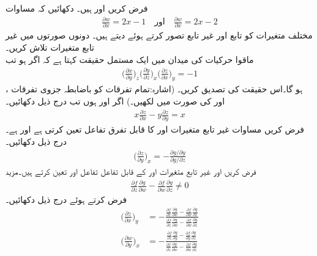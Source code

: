 فرض کریں  اور  ہیں۔ دکھائیں کہ مساوات
\begin{align*}
\tfrac{\partial w}{\partial x}=2x-1\quad \text{اور}\quad \tfrac{\partial w}{\partial x}=2x-2
\end{align*}
مختلف متغیرات کو تابع اور غیر تابع تصور کرتے ہوئے    دیتے ہیں۔ دونوں صورتوں  میں غیر تابع متغیرات تلاش کریں۔
\\
ماقوا حرکیات  کی میدان میں  ایک  مستمل حقیقت کہتا ہے کہ اگر  ہو تب
\begin{align*}
\big(\frac{\partial x}{\partial y}\big)_z \big(\frac{\partial y}{\partial z}\big)_x  \big(\frac{\partial z}{\partial x}\big)_y=-1
\end{align*}
ہو گا۔اس حقیقت  کی تصدیق کریں۔ (اشارہ:تمام تفرقات کو باضابطہ جزوی تفرقات ،   اور  کی صورت میں لکھیں۔)
اگر   اور  ہوں تب درج ذیل دکھائیں۔
\begin{align*}
x\frac{\partial z}{\partial x}-y\frac{\partial z}{\partial y}=x
\end{align*}
فرض کریں  مساوات   غیر تابع متغیرات  اور  کا قابل تفرق تفاعل  تعین کرتی ہے اور  ہے۔ درج ذیل دکھائیں۔
\begin{align*}
\big(\frac{\partial z}{\partial y}\big)_x=-\frac{\partial g/\partial y}{\partial g/\partial z}
\end{align*}
فرض کریں   اور   غیر تابع متغیرات   اور   کے قابل  تفاعل تفاعل  اور  تعین کرتے  ہیں۔مزید  
\begin{align*}
\frac{\partial f}{\partial z}\frac{\partial g}{\partial w}-\frac{\partial f}{\partial w}\frac{\partial g}{\partial z}\ne 0
\end{align*}
فرض کرتے ہوئے درج ذیل دکھائیں۔
\begin{align*}
\big(\frac{\partial z}{\partial x}\big)_y&=-\frac{\frac{\partial f}{\partial x}\frac{\partial g}{\partial w}-\frac{\partial f}{\partial w}\frac{\partial g}{\partial x}}{\frac{\partial f}{\partial z}\frac{\partial g}{\partial w}-\frac{\partial f}{\partial w}\frac{\partial g}{\partial z}}\\
\big(\frac{\partial w}{\partial y}\big)_x&=-\frac{\frac{\partial f}{\partial z}\frac{\partial g}{\partial y}-\frac{\partial f}{\partial y}\frac{\partial g}{\partial z}}{\frac{\partial f}{\partial z}\frac{\partial g}{\partial w}-\frac{\partial f}{\partial w}\frac{\partial g}{\partial z}}
\end{align*}

